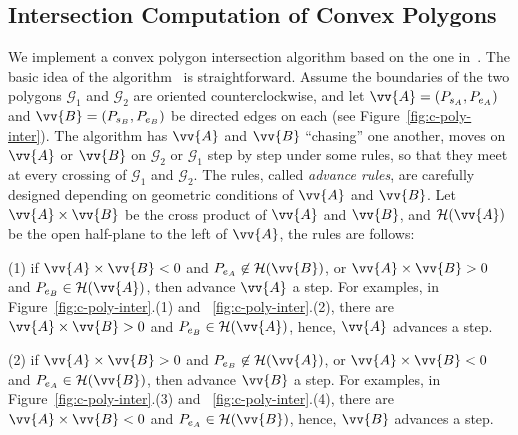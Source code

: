 \subsection{Intersection Computation of Convex Polygons}

We implement a convex polygon intersection algorithm based on the one in~\cite{ORourke:Intersection}.
%
The basic idea of the algorithm~\cite{ORourke:Intersection} is straightforward. Assume the boundaries of the two polygons $\mathcal{G}_1$ and $\mathcal{G}_2$ are oriented counterclockwise, and let $\vv{A} = (P_{s_A}, P_{e_A})$ and $\vv{B} = (P_{s_B}, P_{e_B})$ be directed edges on each (see Figure~\ref{fig:c-poly-inter}).
%
The algorithm has $\vv{A}$ and $\vv{B}$ ``chasing'' one another, \ie moves on $\vv{A}$ or $\vv{B}$ on $\mathcal{G}_2$ or $\mathcal{G}_1$ step by step under some rules, so that they meet at every crossing of $\mathcal{G}_1$ and $\mathcal{G}_2$.
%
The rules, called \emph{advance rules}, are carefully designed depending on geometric conditions of $\vv{A}$ and $\vv{B}$.
Let $\vv{A} \times \vv{B}$ be the cross product of $\vv{A}$ and $\vv{B}$, and $\mathcal{H}(\vv{A})$ be the open half-plane to the left of $\vv{A}$, the rules are follows:

(1) if $\vv{A} \times \vv{B} < 0$ and $P_{e_A} \not \in \mathcal{H}(\vv{B})$, or $\vv{A} \times \vv{B} > 0$ and $P_{e_B} \in \mathcal{H}(\vv{A})$, then advance $\vv{A}$ a step. For examples, in Figure~\ref{fig:c-poly-inter}.(1) and ~\ref{fig:c-poly-inter}.(2), there are $\vv{A} \times \vv{B} > 0$ and $P_{e_B} \in \mathcal{H}(\vv{A})$, hence, $\vv{A}$ advances a step.

(2) if $\vv{A} \times \vv{B} > 0$ and $P_{e_B} \not \in \mathcal{H}(\vv{A})$, or $\vv{A} \times \vv{B} < 0$ and $P_{e_A} \in \mathcal{H}(\vv{B})$, then advance $\vv{B}$ a step. For examples, in Figure~\ref{fig:c-poly-inter}.(3) and ~\ref{fig:c-poly-inter}.(4), there are $\vv{A} \times \vv{B} < 0$ and $P_{e_A} \in \mathcal{H}(\vv{B})$, hence, $\vv{B}$ advances a step.


